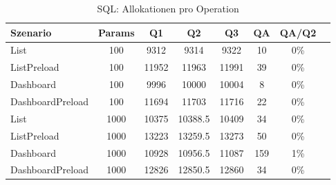 \begin{table}[ht]
\centering
\caption{SQL: Allokationen pro Operation}
\begin{tabular}{lccccccc}
\toprule
Szenario & Params & Q1 & Q2 & Q3 & QA & QA/Q2 \\
\midrule
	List & 100 & 9312 & 9314 & 9322 & 10 & 0\% \\
	ListPreload & 100 & 11952 & 11963 & 11991 & 39 & 0\% \\
	Dashboard & 100 & 9996 & 10000 & 10004 & 8 & 0\% \\
	DashboardPreload & 100 & 11694 & 11703 & 11716 & 22 & 0\% \\
	List & 1000 & 10375 & 10388.5 & 10409 & 34 & 0\% \\
	ListPreload & 1000 & 13223 & 13259.5 & 13273 & 50 & 0\% \\
	Dashboard & 1000 & 10928 & 10956.5 & 11087 & 159 & 1\% \\
	DashboardPreload & 1000 & 12826 & 12850.5 & 12860 & 34 & 0\% \\
\bottomrule
\end{tabular}
\label{tab:benchmark_sql_allocsperop}
\end{table}
	